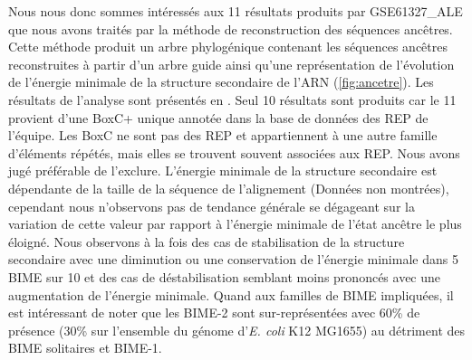 \documentclass[12pt,a4paper]{report}
\begin{document}
\begin{onehalfspace}
\begin{figure}
{\label{fig:ancetre} }
\end{figure}

Nous nous donc sommes intéressés aux 11 résultats produits par GSE61327\_ALE que nous avons traités par la méthode de reconstruction des séquences ancêtres. Cette méthode produit un arbre phylogénique contenant les séquences ancêtres reconstruites à partir d'un arbre guide ainsi qu'une représentation de l'évolution de l'énergie minimale de la structure secondaire de l'ARN (\autoref{fig:ancetre}). Les résultats de l'analyse sont présentés en . Seul 10 résultats sont produits car le 11 provient d'une BoxC+ unique annotée dans la base de données des REP de l'équipe. Les BoxC ne sont pas des REP et appartiennent à une autre famille d’éléments répétés, mais elles se trouvent souvent associées aux REP. Nous avons jugé préférable de l'exclure. L'énergie minimale de la structure secondaire est dépendante de la taille de la séquence de l'alignement (Données non montrées), cependant nous n'observons pas de tendance générale se dégageant sur la variation de cette valeur par rapport à l'énergie minimale de l'état ancêtre le plus éloigné. Nous observons à la fois des cas de stabilisation de la structure secondaire avec une diminution ou une conservation de l'énergie minimale dans 5 BIME sur 10 et des cas de déstabilisation semblant moins prononcés avec une augmentation de l'énergie minimale. Quand aux familles de BIME impliquées, il est intéressant de noter que les BIME-2 sont sur-représentées avec 60\% de présence (30\% sur l'ensemble du génome d'\textit{E. coli} K12 MG1655) au détriment des BIME solitaires et BIME-1.


\end{onehalfspace}
\end{document}
